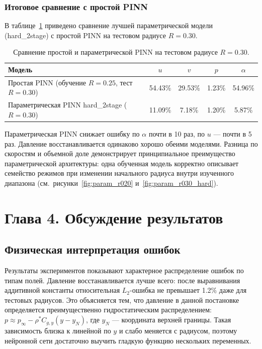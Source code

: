 \documentclass[12pt,a4paper]{article}
\begin{document}
\subsubsection{Итоговое сравнение с простой PINN}

В таблице~\ref{tab:simple_vs_param} приведено сравнение лучшей параметрической
модели (hard\_2stage) с простой PINN на тестовом радиусе \(R=0.30\).

\begin{table}[H]
    \centering
    \begin{tabular}{l|cccc}
        \hline
        Модель & \(u\) & \(v\) & \(p\) & \(\alpha\) \\
        \hline
        Простая PINN (обучение \(R=0.25\), тест \(R=0.30\)) & 54.43\% & 29.53\% & 1.23\% & 54.96\% \\
        Параметрическая PINN hard\_2stage (\(R=0.30\))        & 11.09\% & 7.18\% & 1.20\% & 5.87\% \\
        \hline
    \end{tabular}
    \caption{Сравнение простой и параметрической PINN на тестовом радиусе \(R=0.30\).}
    \label{tab:simple_vs_param}
\end{table}

Параметрическая PINN снижает ошибку по \(\alpha\) почти в 10 раз, по \(u\) ---
почти в 5 раз. Давление восстанавливается одинаково хорошо обеими моделями.
Разница по скоростям и объемной доле демонстрирует принципиальное преимущество
параметрической архитектуры: одна обученная модель корректно описывает семейство
режимов при изменении начального радиуса внутри изученного диапазона
(см.~рисунки~\ref{fig:param_r020} и~\ref{fig:param_r030_hard}).

\section{Глава 4. Обсуждение результатов}

\subsection{Физическая интерпретация ошибок}

Результаты экспериментов показывают характерное распределение ошибок по типам
полей. Давление восстанавливается лучше всего: после выравнивания аддитивной
константы относительная \(L_2\)-ошибка не превышает 1.2\% даже для тестовых
радиусов. Это объясняется тем, что давление в данной постановке определяется
преимущественно гидростатическим распределением: \(p \approx p_\infty - \rho^*
C_{g,y}(y - y_N)\), где \(y_N\) --- координата верхней границы. Такая зависимость
близка к линейной по \(y\) и слабо меняется с радиусом, поэтому нейронной сети
достаточно выучить гладкую функцию нескольких переменных.
\end{document}
